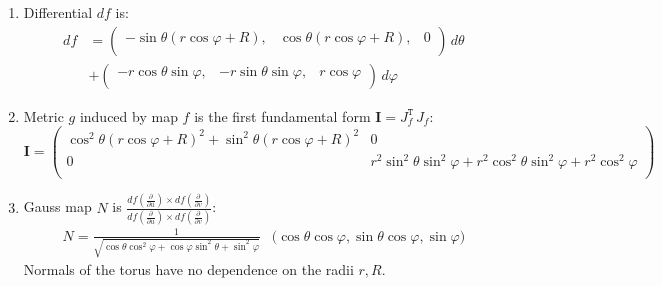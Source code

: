 \documentclass{article}
\newcommand\ifrac[2]{{\displaystyle\frac{#1}{#2}}}
\begin{document}
\begin{enumerate}[label=(\alph*)]
    \item
    Differential $df$ is:
    \begin{align*}
        df &=
        \left(
        \begin{array}{ccc}
        -\sin\theta (r \cos\varphi+R), & \cos\theta (r \cos\varphi+R), & 0 \\
        \end{array}
        \right)\, d\theta \\
        &+ 
        \left(
        \begin{array}{ccc}
        -r \cos\theta \sin\varphi, & -r \sin\theta \sin\varphi, & r \cos\varphi \\
        \end{array}
        \right)\, d\varphi
    \end{align*}

    \item
    Metric $g$ induced by map $f$ is the first fundamental form $\mathbf{I} = J_f^\texttt{T} \, J_f$:
    $$
    \mathbf{I} =
    \left(
    \begin{array}{cc}
    \cos ^2\theta (r \cos \varphi+R)^2+\sin ^2\theta (r \cos \varphi+R)^2 & 0 \\
    0 & r^2 \sin ^2\theta \sin ^2\varphi+r^2 \cos ^2\theta \sin ^2\varphi+r^2 \cos ^2\varphi \\
    \end{array}
    \right)
    $$
    
    \item
    Gauss map $N$ is $\ifrac{df(\frac{\partial}{\partial u}) \times df(\frac{\partial}{\partial v})}{df(\frac{\partial}{\partial u}) \times df(\frac{\partial}{\partial v})}$:
    \begin{align*}
        N = 
        \frac{1}{\sqrt{ \cos \theta \cos^2 \varphi + \cos \varphi \sin^2 \theta + \sin^2 \varphi }}&\Big(\cos \theta \cos \varphi ,
        \sin \theta \cos \varphi ,
        \sin \varphi \Big)
    \end{align*}
    Normals of the torus have no dependence on the radii $r, R$.


\end{enumerate}
\end{document}
